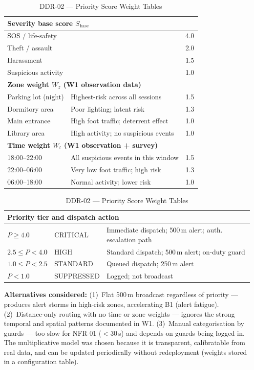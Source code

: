 \documentclass[12pt,a4paper]{article}
\begin{document}
\begin{table}[h]
\caption{DDR-02 --- Priority Score Weight Tables}
\label{tab:weights}
\centering
\begin{tabular}{llc}
\toprule
\multicolumn{3}{l}{\textbf{Severity base score $S_{\text{base}}$}} \\
\midrule
SOS / life-safety & & 4.0 \\
Theft / assault & & 2.0 \\
Harassment & & 1.5 \\
Suspicious activity & & 1.0 \\
\midrule
\multicolumn{3}{l}{\textbf{Zone weight $W_z$ (W1 observation data)}} \\
\midrule
Parking lot (night) & Highest-risk across all sessions & 1.5 \\
Dormitory area & Poor lighting; latent risk & 1.3 \\
Main entrance & High foot traffic; deterrent effect & 1.0 \\
Library area & High activity; no suspicious events & 1.0 \\
\midrule
\multicolumn{3}{l}{\textbf{Time weight $W_t$ (W1 observation + survey)}} \\
\midrule
18:00--22:00 & All suspicious events in this window & 1.5 \\
22:00--06:00 & Very low foot traffic; high risk & 1.3 \\
06:00--18:00 & Normal activity; lower risk & 1.0 \\
\bottomrule
\end{tabular}
\quad
\begin{tabular}{lll}
\toprule
\multicolumn{3}{l}{\textbf{Priority tier and dispatch action}} \\
\midrule
$P \geq 4.0$ & CRITICAL & Immediate dispatch; 500\,m alert; auth. escalation path \\
$2.5 \leq P < 4.0$ & HIGH & Standard dispatch; 500\,m alert; on-duty guard \\
$1.0 \leq P < 2.5$ & STANDARD & Queued dispatch; 250\,m alert \\
$P < 1.0$ & SUPPRESSED & Logged; not broadcast \\
\bottomrule
\end{tabular}
\end{table}

\textbf{Alternatives considered:}
(1)~Flat 500\,m broadcast regardless of priority --- produces alert
storms in high-risk zones, accelerating B1 (alert fatigue).
(2)~Distance-only routing with no time or zone weights --- ignores the
strong temporal and spatial patterns documented in W1.
(3)~Manual categorisation by guards --- too slow for NFR-01 ($<$30\,s)
and depends on guards being logged in.
The multiplicative model was chosen because it is transparent,
calibratable from real data, and can be updated periodically
without redeployment (weights stored in a configuration table).
\end{document}
